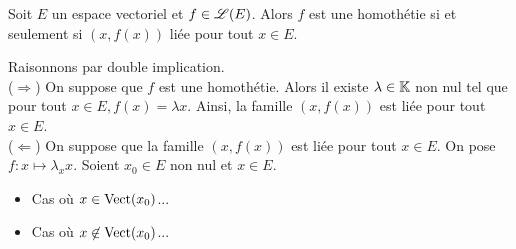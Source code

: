 \begin{prop}
    Soit $E$ un espace vectoriel et $f \in \mathscr{L}(E)$. Alors $f$ est une homothétie si et seulement si $(x, f(x))$ liée pour tout $x \in E$.
\end{prop}

\begin{marginfigure}
    
\end{marginfigure}

\begin{preuve}
    Raisonnons par double implication. \\
    ($\Rightarrow$) On suppose que $f$ est une homothétie. Alors il existe $\lambda \in \mathbb{K}$ non nul tel que pour tout $x \in E, f(x) = \lambda x$. Ainsi, la famille $(x, f(x))$ est liée pour tout $x \in E$. \\
    ($\Leftarrow$) On suppose que la famille $(x, f(x))$ est liée pour tout $x \in E$. On pose $\boxed{f:x \mapsto \lambda_x x}$. Soient $x_0 \in E$ non nul et $x \in E$. 
    \begin{itemize}
        \item Cas où $x \in \mathrm{Vect}(x_0)$... 
        \item Cas où $x \not \in \mathrm{Vect}(x_0)$...
    \end{itemize}
\end{preuve}
